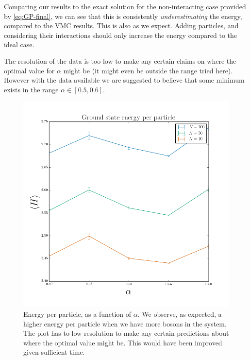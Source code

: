 \documentclass[a4paper, 11pt]{article}
\begin{document}
\begin{multicols}{2}
Comparing our results to the exact solution for the non-interacting case
provided by \eqref{eq:GP-final}, we can
see that this is consistently \textit{underestimating} the energy, compared to
the VMC results. This is also as we expect. Adding particles, and considering
their interactions should only increase the energy compared to the ideal case.

The resolution of the data is too low to make any certain claims on where the
optimal value for $\alpha$ might be (it might even be outside the range tried
here). However with the data available we are suggested to believe that some
minimum exists in the range $\alpha\in [0.5, 0.6]$.

\end{multicols}
\begin{figure}[!h]
    \centering
    \includegraphics[width=0.8\linewidth]{../results/interacting-energy-per-particle.png}
    \caption{Energy per particle, as a function of $\alpha$. We observe, as
    expected, a higher energy per particle when we have more bosons in the
    system. The plot has to low resolution to make any certain predictions about
    where the optimal value might be. This would have been improved given
    sufficient time.}
    \label{fig:interacting-energy-per-particle}
\end{figure}
\end{document}
